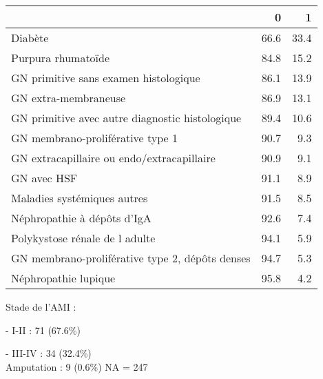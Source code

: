 \documentclass[11pt,a4paper]{article}\usepackage[]{graphicx}\usepackage[]{color}
\begin{document}
\begin{table}[H]
\centering
\begin{tabular}{lrr}
  \hline
 & 0 & 1 \\ 
  \hline
Diabète & 66.6 & 33.4 \\ 
  Purpura rhumatoïde & 84.8 & 15.2 \\ 
  GN primitive sans examen histologique & 86.1 & 13.9 \\ 
  GN extra-membraneuse & 86.9 & 13.1 \\ 
  GN primitive avec autre diagnostic histologique & 89.4 & 10.6 \\ 
  GN membrano-proliférative type 1 & 90.7 & 9.3 \\ 
  GN extracapillaire ou endo/extracapillaire & 90.9 & 9.1 \\ 
  GN avec HSF & 91.1 & 8.9 \\ 
  Maladies systémiques autres & 91.5 & 8.5 \\ 
  Néphropathie à dépôts d'IgA & 92.6 & 7.4 \\ 
  Polykystose rénale de l adulte & 94.1 & 5.9 \\ 
  GN membrano-proliférative type 2, dépôts denses & 94.7 & 5.3 \\ 
  Néphropathie lupique & 95.8 & 4.2 \\ 
   \hline
\end{tabular}
\end{table}


Stade de l’AMI : 

- I-II : 71 (67.6\%)

- III-IV : 34 (32.4\%)
~\\

Amputation : 9 (0.6\%) NA = 247
\end{document}
